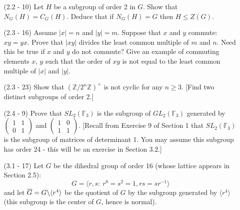 \documentclass[12pt]{article}
\begin{document}
\begin{enumerate}
 
\item[(2.2 - 10)] Let $H$ be a subgroup of order 2 in $G$. Show that
    $N_G(H) = C_G(H)$. Deduce that if $N_G(H) = G$ then
    $H\leq Z(G)$.

\begin{mybox}

\end{mybox}


\item[(2.3 - 16)] Assume $|x| = n$ and $|y| = m$. Suppose
    that $x$ and $y$ commute: $xy = yx$. Prove that
    $|xy|$ divides the
    least common multiple of $m$ and $n$. Need this be true
    if $x$ and $y$ do not commute? Give an example of commuting
    elements $x$, $y$ such that the order of $xy$ is not
    equal to the least common multiple of $|x|$ and $|y|$.

\begin{mybox}

\end{mybox}

    
\item[(2.3 - 23)] Show that $(\mathbb{Z}/2^n\mathbb{Z})^
{\times}$
    is not cyclic for any $n\geq 3$.
    [Find two distinct subgroups of order 2.]
  
\begin{mybox}
  
\end{mybox}


\item[(2.4 - 9)] Prove that $SL_2(\mathbb{F}_3)$ is the
subgroup of
$GL_2(\mathbb{F}_3)$ generated by $\left(\begin{array}{cc}
    1 & 1\\
    0 & 1
\end{array}\right)$ and $\left(\begin{array}{cc}
    1 & 0\\
    1 & 1
\end{array}\right)$. [Recall from Exercise 9 of Section 1
that $SL_2(\mathbb{F}_3)$ is the subgroup of matrices of
determinant 1. You may assume this subgroup has order 24
- this will be an exercise in Section 3.2.]

\begin{mybox}
  
\end{mybox}
  

\item[(3.1 - 17)] Let $G$ be the dihedral group of order 16
    (whose lattice appears in Section 2.5):
    $$G=\langle r,s :\ r^8=s^2= 1, rs=sr^{-1}\rangle$$
    and let $\overline{G} = G\char`\\\langle r^4\rangle$ be
    the quotient
    of $G$ by the subgroup generated by $\langle r^4\rangle$
    (this subgroup is the center of $G$, hence is normal).
\begin{enumerate}
    

\end{enumerate}
\end{enumerate}
\end{document}
